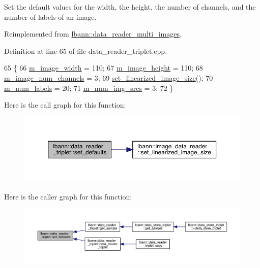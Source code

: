 Set the default values for the width, the height, the number of channels, and the number of labels of an image. 



Reimplemented from \hyperlink{classlbann_1_1data__reader__multi__images_a5abe6981d750bc145e50f6141772805c}{lbann\+::data\+\_\+reader\+\_\+multi\+\_\+images}.



Definition at line 65 of file data\+\_\+reader\+\_\+triplet.\+cpp.


\begin{DoxyCode}
65                                        \{
66   \hyperlink{classlbann_1_1image__data__reader_af001f3d1c0f1c580b66988233b3a64f0}{m\_image\_width} = 110;
67   \hyperlink{classlbann_1_1image__data__reader_a0632efa3deaa9d61e671f741909eb3fe}{m\_image\_height} = 110;
68   \hyperlink{classlbann_1_1image__data__reader_aab1a440f361521dc7bd583cefe1061f8}{m\_image\_num\_channels} = 3;
69   \hyperlink{classlbann_1_1image__data__reader_a0164b0e3abbe92daef73b36fb925403e}{set\_linearized\_image\_size}();
70   \hyperlink{classlbann_1_1image__data__reader_af280e8758a6ec3acee7c62e6351d17e0}{m\_num\_labels} = 20;
71   \hyperlink{classlbann_1_1data__reader__multi__images_a70752a5442e99333fec52def9eadc58f}{m\_num\_img\_srcs} = 3;
72 \}
\end{DoxyCode}
Here is the call graph for this function\+:\nopagebreak
\begin{figure}[H]
\begin{center}
\leavevmode
\includegraphics[width=350pt]{classlbann_1_1data__reader__triplet_a88bc385a2d42e9f78a768ff496036843_cgraph}
\end{center}
\end{figure}
Here is the caller graph for this function\+:\nopagebreak
\begin{figure}[H]
\begin{center}
\leavevmode
\includegraphics[width=350pt]{classlbann_1_1data__reader__triplet_a88bc385a2d42e9f78a768ff496036843_icgraph}
\end{center}
\end{figure}
\mbox{\label{classlbann_1_1data__reader__triplet_a8172b4ac97d18b51814578a19a7f75c7}} 
